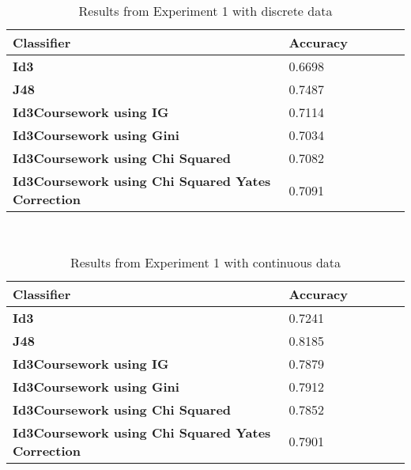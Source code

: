 \documentclass{cmppgr}
\begin{document}
\begin{table}[hb]
  \centering
  \scriptsize
  \caption{Results from Experiment 1 with discrete data}
  \begin{tabular}{|p{2cm}|p{2cm}|p{2cm}| p{2cm} |p{2cm}| p{2cm}|}
  \hline \bf Classifier & \bf Accuracy \\ [10pt]

  \hline \bf Id3 & 0.6698 \\ [10pt]

  \hline \bf J48 & 0.7487 \\ [10pt]

  \hline \bf Id3Coursework using IG & 0.7114 \\ [10pt]

  \hline \bf Id3Coursework using Gini & 0.7034 \\ [10pt]

  \hline \bf Id3Coursework using Chi Squared & 0.7082 \\ [10pt]

  \hline \bf Id3Coursework using Chi Squared Yates Correction & 0.7091 \\ [10pt]

  \hline
  \end{tabular} \\
\end{table}

\begin{table}[!h]
  \centering
  \scriptsize
  \caption{Results from Experiment 1 with continuous data}
  \begin{tabular}{|p{2cm}|p{2cm}|p{2cm}| p{2cm} |p{2cm}| p{2cm}|}
  \hline \bf Classifier & \bf Accuracy \\ [10pt]

  \hline \bf Id3 & 0.7241 \\ [10pt]

  \hline \bf J48 & 0.8185 \\ [10pt]

  \hline \bf Id3Coursework using IG & 0.7879 \\ [10pt]

  \hline \bf Id3Coursework using Gini & 0.7912 \\ [10pt]

  \hline \bf Id3Coursework using Chi Squared & 0.7852 \\ [10pt]

  \hline \bf Id3Coursework using Chi Squared Yates Correction & 0.7901 \\ [10pt]

  \hline
  \end{tabular} \\
\end{table}
\end{document}
